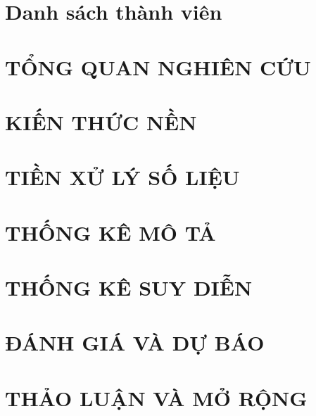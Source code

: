 \documentclass[12pt,a4paper]{report}
\begin{document}
	
	\thispagestyle{empty}
	
	\newpage
	\tableofcontents
	\clearpage

    \renewcommand{\thechapter}{\arabic{chapter}}
	\chapter{Danh sách thành viên}
	
    \chapter{TỔNG QUAN NGHIÊN CỨU}
    \setcounter{chapter}{1}
    
    \chapter{KIẾN THỨC NỀN}
    \setcounter{chapter}{2}
    
    \chapter{TIỀN XỬ LÝ SỐ LIỆU}
    \setcounter{chapter}{3}
    
    \chapter{THỐNG KÊ MÔ TẢ}
    \setcounter{chapter}{4}
    
    \chapter{THỐNG KÊ SUY DIỄN}
    \setcounter{chapter}{5}
    
    \chapter{ĐÁNH GIÁ VÀ DỰ BÁO}
    \setcounter{chapter}{6}
    
    \chapter{THẢO LUẬN VÀ MỞ RỘNG}
    \setcounter{chapter}{7}
    
    
	
\end{document}
